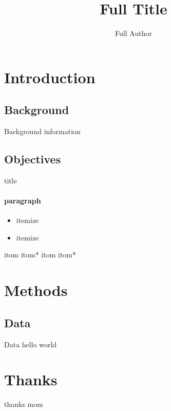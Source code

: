 \documentclass[
  color=002244,
  logo=fig/logo,
]{slides}
\title[Short Title]{Full Title}
\author[Short Author]{Full Author}
\institute{Institute}
\begin{document}
  \maketitle
  \section{Introduction}
  \subsection{Background}
  \begin{frame}{Background}
    information
  \end{frame}
  \subsection{Objectives}
  \begin{frame}{title}
    \paragraph{paragraph}
    \begin{itemize}
      \item itemize
      \item itemize
    \end{itemize}
    \itom itom
    \itom* itom*
    \itom itom
    \itom* itom*
  \end{frame}
  \section{Methods}
  \subsection{Data}
  \begin{frame}{Data}
    hello world
  \end{frame}
  \section[]{Thanks}
  \begin{frame}{thanks}
    mom
  \end{frame}
\end{document}
